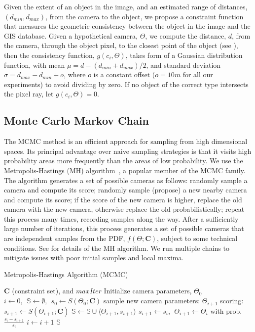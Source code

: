 Given the extent of an object in the image, and an
%
estimated range of distances, $(d_{min},d_{max})$, from the camera to
the object, we propose a constraint function that measures the
geometric consistency between the object in the image and the GIS
database. Given a hypothetical camera, $\Theta$, we compute the
distance, $d$, from the camera, through the object pixel, to the
closest point of the object (see ), then the
consistency function, $g(c_i, \Theta)$, takes form of a Gaussian
distribution function, with mean $\mu = d - (d_{min} + d_{max})/2$,
and standard deviation $\sigma = d_{max} - d_{min} + o$, where $o$ is
a constant offset ($o=10 m$ for all our experiments) to avoid dividing
by zero. If no object of the correct type intersects the pixel ray,
let $g(c_i, \Theta) = 0$.

\subsection{Monte Carlo Markov Chain}
\label{sec:mcmc}

The MCMC method is an efficient approach for sampling from high
dimensional spaces. Its principal advantage over naive sampling
strategies is that it visits high probability areas more frequently
than the areas of low probability.  We use the Metropolis-Hastings
(MH) algorithm~\cite{chib1995understanding}, a popular member of the
MCMC family.  The algorithm generates a set of possible cameras as
follows: randomly sample a camera and compute its score; randomly
sample (propose) a new nearby camera and compute its score; if the
score of the new camera is higher, replace the old camera with the new
camera, otherwise replace the old probabilistically; repeat this
process many times, recording samples along the way. After a
sufficiently large number of iterations, this process generates a set
of possible cameras that are independent samples from the PDF,
$f(\Theta;\mathbf{C})$, subject to some technical conditions. See
 for details of the MH algorithm. We run multiple
chains to mitigate issues with poor initial samples and local maxima.

\begin{algorithm}[t]
  \caption{Metropolis-Hastings Algorithm (MCMC)}
  \begin{algorithmic}[1]
    \REQUIRE $\mathbf{C}$ (constraint set), and $maxIter$
    \STATE Initialize camera parameters, $\Theta_0$
    \STATE $i \gets 0,~~ \mathbb{S} \gets \emptyset,~~s_0 \gets S(\Theta_0;
    \mathbf{C})$
       \STATE sample new camera parameters: $\Theta_{i+1}$ \label{alg:stp:sampling}
       \STATE scoring: $s_{i+1} \gets S(\Theta_{i+1}; \mathbf{C})$
       \STATE $\mathbb{S} \gets \mathbb{S} \cup \langle\Theta_{i+1}, s_{i+1}\rangle$
       \STATE $s_{i+1} \gets s_i,~~\Theta_{i+1} \gets \Theta_i$ with 
       prob. $\frac{s_i - s_{i+1}}{s_i}$
       \ENDIF
       \STATE $i \gets i + 1$
    \ENDWHILE
    \STATE \Return $\mathbb{S}$
  \end{algorithmic}
  \label{alg:MH-algorithm}
\end{algorithm}


